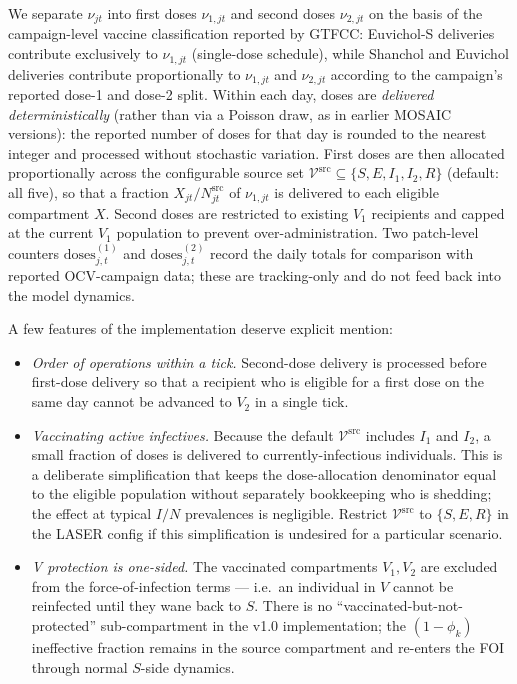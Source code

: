 \documentclass[
]{book}
\providecommand{\tightlist}{%
  \setlength{\itemsep}{0pt}\setlength{\parskip}{0pt}}
\begin{document}
We separate \(\nu_{jt}\) into first doses \(\nu_{1,jt}\) and second doses \(\nu_{2,jt}\) on the basis of the campaign-level vaccine classification reported by GTFCC: Euvichol-S deliveries contribute exclusively to \(\nu_{1,jt}\) (single-dose schedule), while Shanchol and Euvichol deliveries contribute proportionally to \(\nu_{1,jt}\) and \(\nu_{2,jt}\) according to the campaign's reported dose-1 and dose-2 split. Within each day, doses are \emph{delivered deterministically} (rather than via a Poisson draw, as in earlier MOSAIC versions): the reported number of doses for that day is rounded to the nearest integer and processed without stochastic variation. First doses are then allocated proportionally across the configurable source set \(\mathcal{V}^{\text{src}} \subseteq \{S, E, I_1, I_2, R\}\) (default: all five), so that a fraction \(X_{jt} / N^{\text{src}}_{jt}\) of \(\nu_{1,jt}\) is delivered to each eligible compartment \(X\). Second doses are restricted to existing \(V_1\) recipients and capped at the current \(V_1\) population to prevent over-administration. Two patch-level counters \(\text{doses}^{(1)}_{j,t}\) and \(\text{doses}^{(2)}_{j,t}\) record the daily totals for comparison with reported OCV-campaign data; these are tracking-only and do not feed back into the model dynamics.

A few features of the implementation deserve explicit mention:

\begin{itemize}
\tightlist
\item
  \emph{Order of operations within a tick.} Second-dose delivery is processed before first-dose delivery so that a recipient who is eligible for a first dose on the same day cannot be advanced to \(V_2\) in a single tick.
\item
  \emph{Vaccinating active infectives.} Because the default \(\mathcal{V}^{\text{src}}\) includes \(I_1\) and \(I_2\), a small fraction of doses is delivered to currently-infectious individuals. This is a deliberate simplification that keeps the dose-allocation denominator equal to the eligible population without separately bookkeeping who is shedding; the effect at typical \(I/N\) prevalences is negligible. Restrict \(\mathcal{V}^{\text{src}}\) to \(\{S, E, R\}\) in the LASER config if this simplification is undesired for a particular scenario.
\item
  \emph{V protection is one-sided.} The vaccinated compartments \(V_1, V_2\) are excluded from the force-of-infection terms --- i.e.~an individual in \(V\) cannot be reinfected until they wane back to \(S\). There is no ``vaccinated-but-not-protected'' sub-compartment in the v1.0 implementation; the \((1-\phi_k)\) ineffective fraction remains in the source compartment and re-enters the FOI through normal \(S\)-side dynamics.
\end{itemize}
\end{document}
